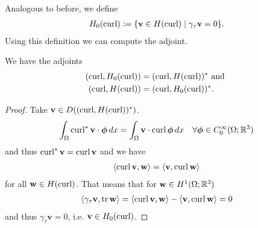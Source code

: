 \documentclass[../master_thesis.tex]{subfiles}
\begin{document}
Analogous to before, we define 
\begin{align*}
    H_0(\operatorname{curl}) \vcentcolon= \{ \mathbf{v} \in H(\operatorname{curl}) \mid \gamma_\tau \mathbf{v} = 0\}.
\end{align*}
Using this definition we can compute the adjoint.
\begin{theorem}
    We have the adjoints
    \begin{align*}
        (\operatorname{curl}, H_0(\operatorname{curl})) &= (\operatorname{curl}, H(\operatorname{curl}))^* \text{ and }
        \\ (\operatorname{curl}, H(\operatorname{curl})) &= (\operatorname{curl}, H_0(\operatorname{curl}))^*.
    \end{align*}
\end{theorem}
\begin{proof}
    Take $\mathbf{v} \in D((\operatorname{curl}, H(\operatorname{curl}))^*)$. 
    \begin{align*}
        \int_\Omega \operatorname{curl}^*\mathbf{v} \cdot \boldsymbol{\phi} \, dx
        = \int_\Omega \mathbf{v} \cdot \operatorname{curl} \boldsymbol{\phi} \, dx
            \quad \forall \boldsymbol{\phi} \in C_0^\infty(\Omega;\mathbb{R}^3)
    \end{align*}
    and thus $\operatorname{curl}^* \mathbf{v} = \operatorname{curl} \mathbf{v}$ and we have 
    \begin{align}
        \langle \operatorname{curl} \mathbf{v}, \mathbf{w} \rangle
        = \langle \mathbf{v}, \operatorname{curl} \mathbf{w} \rangle \label{eq:adjoint_curl_equation}
    \end{align}
    for all $\mathbf{w} \in H(\operatorname{curl})$. That means that for $\mathbf{w} \in H^1(\Omega;\mathbb{R}^3)$
    \begin{align*}
        \langle \gamma_\tau \mathbf{v}, \operatorname{tr} \mathbf{w} \rangle 
        =  \langle \operatorname{curl} \mathbf{v}, \mathbf{w} \rangle - \langle \mathbf{v}, \operatorname{curl} \mathbf{w} \rangle
        = 0
    \end{align*}
    and thus $\gamma_\tau \mathbf{v} = 0$, i.e. $\mathbf{v} \in H_0(\operatorname{curl})$.


\end{proof}
\end{document}
